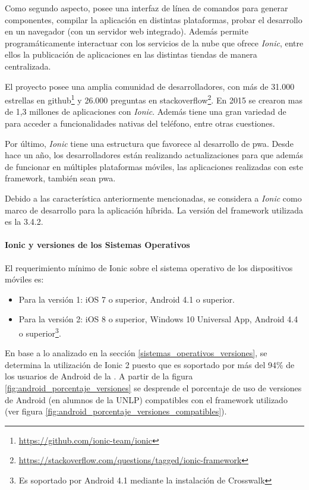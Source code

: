 Como segundo aspecto, posee una interfaz de línea de comandos para generar componentes, compilar la aplicación en distintas plataformas, probar el desarrollo en un navegador (con un servidor web integrado). Además permite programáticamente interactuar con los servicios de la nube que ofrece \textit{Ionic}, entre ellos la publicación de aplicaciones en las distintas tiendas de manera centralizada.

El proyecto posee una amplia comunidad de desarrolladores, con más de 31.000 estrellas en \gls{github}\footnote{\url{https://github.com/ionic-team/ionic}} y 26.000 preguntas en \gls{stackoverflow}\footnote{\url{https://stackoverflow.com/questions/tagged/ionic-framework}}. En 2015 se crearon mas de 1,3 millones de aplicaciones con \textit{Ionic}\cite{ionic2017concepts}. Además tiene una gran variedad de  para acceder a funcionalidades nativas del teléfono, entre otras cuestiones.

Por último, \textit{Ionic} tiene una estructura que favorece al desarrollo de \gls{pwa}. Desde hace un año, los desarrolladores están realizando actualizaciones para que además de funcionar en múltiples plataformas móviles, las aplicaciones realizadas con este \gls{framework}, también sean \gls{pwa}\cite{lynch2016pwa}.

Debido a las característica anteriormente mencionadas, se considera a \textit{Ionic} como marco de desarrollo para la aplicación híbrida. La versión del \gls{framework} utilizada es la 3.4.2.

\paragraph{Ionic y versiones de los Sistemas Operativos}
\label{ionic_android}

El requerimiento mínimo de Ionic sobre el sistema operativo de los dispositivos móviles es\cite{ionicframework2017support}:
\begin{itemize}
\item Para la versión 1: iOS 7 o superior, Android 4.1 o superior.
\item Para la versión 2: iOS 8 o superior, Windows 10 Universal App, Android 4.4 o superior\footnote{Es soportado por Android 4.1 mediante la instalación de Crosswalk}.
\end{itemize}

En base a lo analizado en la sección \ref{sistemas_operativos_versiones}, se determina la utilización de Ionic 2 puesto que es soportado por más del 94\% de los usuarios de Android de la \unlp{}.
A partir de la figura \ref{fig:android_porcentaje_versiones} se desprende el porcentaje de uso de versiones de Android (en alumnos de la UNLP) compatibles con el \gls{framework} utilizado (ver figura \ref{fig:android_porcentaje_versiones_compatibles}).

